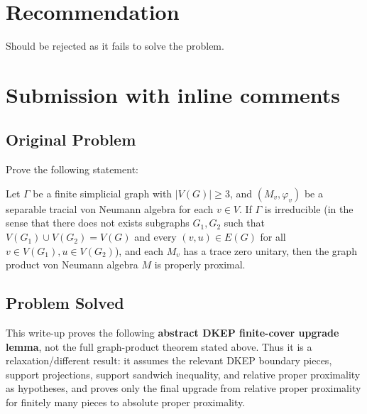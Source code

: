 \documentclass[12pt]{article}
\newcommand{\VV}{V}
\newcommand{\EE}{E}
\newcommand{\GG}{G}
\begin{document}
\section{Recommendation}

  Should be rejected as it fails to solve the problem.

  \section{Submission with inline comments}


\date{}


\subsection*{Original Problem}

Prove the following statement:

Let $\Gamma$ be a finite simplicial graph with $|\VV(\GG)|\geq 3$, and $(M_v,\varphi_v)$ be a separable tracial von Neumann algebra for each $v\in \VV$. If $\Gamma$ is irreducible (in the sense that there does not exists subgraphs $\GG_1,\GG_2$ such that $ \VV(\GG_1)\cup \VV(\GG_2)=\VV(\GG) $ and every $(v,u)\in \EE(\GG) $ for all $v\in\VV(\GG_1),u\in \VV(\GG_2)$), and each $M_v$ has a trace zero unitary, then the graph product von Neumann algebra $M$ is properly proximal.

\subsection*{Problem Solved}

This write-up proves the following \textbf{abstract DKEP finite-cover upgrade lemma}, not the full graph-product theorem stated above. Thus it is a relaxation/different result: it assumes the relevant DKEP boundary pieces, support projections, support sandwich inequality, and relative proper proximality as hypotheses, and proves only the final upgrade from relative proper proximality for finitely many pieces to absolute proper proximality.
\end{document}
